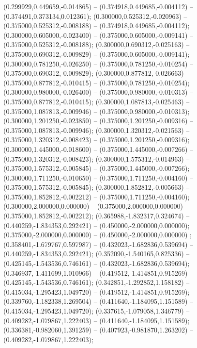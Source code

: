  (0.299929,0.449659,-0.014865) -- (0.374918,0.449685,-0.004112) -- (0.374491,0.373134,0.012361);
 (0.300000,0.525312,-0.020963) -- (0.375000,0.525312,-0.008188) -- (0.374918,0.449685,-0.004112);
 (0.300000,0.605000,-0.023400) -- (0.375000,0.605000,-0.009141) -- (0.375000,0.525312,-0.008188);
 (0.300000,0.690312,-0.025163) -- (0.375000,0.690312,-0.009829) -- (0.375000,0.605000,-0.009141);
 (0.300000,0.781250,-0.026250) -- (0.375000,0.781250,-0.010254) -- (0.375000,0.690312,-0.009829);
 (0.300000,0.877812,-0.026663) -- (0.375000,0.877812,-0.010415) -- (0.375000,0.781250,-0.010254);
 (0.300000,0.980000,-0.026400) -- (0.375000,0.980000,-0.010313) -- (0.375000,0.877812,-0.010415);
 (0.300000,1.087813,-0.025463) -- (0.375000,1.087813,-0.009946) -- (0.375000,0.980000,-0.010313);
 (0.300000,1.201250,-0.023850) -- (0.375000,1.201250,-0.009316) -- (0.375000,1.087813,-0.009946);
 (0.300000,1.320312,-0.021563) -- (0.375000,1.320312,-0.008423) -- (0.375000,1.201250,-0.009316);
 (0.300000,1.445000,-0.018600) -- (0.375000,1.445000,-0.007266) -- (0.375000,1.320312,-0.008423);
 (0.300000,1.575312,-0.014963) -- (0.375000,1.575312,-0.005845) -- (0.375000,1.445000,-0.007266);
 (0.300000,1.711250,-0.010650) -- (0.375000,1.711250,-0.004160) -- (0.375000,1.575312,-0.005845);
 (0.300000,1.852812,-0.005663) -- (0.375000,1.852812,-0.002212) -- (0.375000,1.711250,-0.004160);
 (0.300000,2.000000,0.000000) -- (0.375000,2.000000,0.000000) -- (0.375000,1.852812,-0.002212);
 (0.365988,-1.832317,0.324674) -- (0.440259,-1.834353,0.292421) -- (0.450000,-2.000000,0.000000);
 (0.375000,-2.000000,0.000000) -- (0.450000,-2.000000,0.000000) ;
 (0.358401,-1.679767,0.597987) -- (0.432023,-1.682836,0.539694) -- (0.440259,-1.834353,0.292421);
 (0.352090,-1.540165,0.825336) -- (0.425145,-1.543536,0.746161) -- (0.432023,-1.682836,0.539694);
 (0.346937,-1.411699,1.010966) -- (0.419512,-1.414851,0.915269) -- (0.425145,-1.543536,0.746161);
 (0.342851,-1.292852,1.158182) -- (0.415034,-1.295423,1.049720) -- (0.419512,-1.414851,0.915269);
 (0.339760,-1.182338,1.269504) -- (0.411640,-1.184095,1.151589) -- (0.415034,-1.295423,1.049720);
 (0.337615,-1.079058,1.346779) -- (0.409282,-1.079867,1.222403) -- (0.411640,-1.184095,1.151589);
 (0.336381,-0.982060,1.391259) -- (0.407923,-0.981870,1.263202) -- (0.409282,-1.079867,1.222403);
